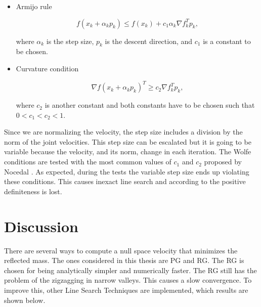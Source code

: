 \begin{itemize}
	\item Armijo rule
	
	\begin{equation}
	f(x_k +  \alpha_k p_k) \le f(x_k) + c_1 \alpha_k \nabla f_k^{T} p_k ,
 	\end{equation}
	
	where $\alpha_k $ is the step size, $p_k$ is the descent direction, and $c_1$ is a constant to be chosen.
	
	\item Curvature condition
	
	\begin{equation}
	\nabla f(x_k + \alpha_k p_k)^{T} \ge  c_2 \nabla f_k^{T} p_k  ,
	\end{equation}	
	
	where $c_2$ is another constant and both constants have to be chosen such that $ 0 < c_1 < c_2 < 1 $.
	
	
\end{itemize}





Since we are normalizing the velocity, the step size includes a division by the norm of the joint velocities. This step size can be escalated but it is going to be variable because the velocity, and its norm, change in each iteration. 
The Wolfe conditions are tested with the most common values of $c_1$ and $c_2$ proposed by Nocedal \cite{Nocedal2006NO}.
As expected, during the tests
the variable step size ends up violating these conditions. This causes inexact line search and according to \cite{intro_opt_design} the positive definiteness is lost.%

\section{Discussion}
\label{sec:comparison_local_minim}


There are several ways to compute a null space velocity that minimizes the reflected mass. The ones considered in this thesis are PG and RG. The RG is chosen for being analytically simpler and numerically faster. The RG still has the problem of the zigzagging in narrow valleys. This causes a slow convergence. To improve this, other Line Search Techniques are implemented, which results are shown below.



